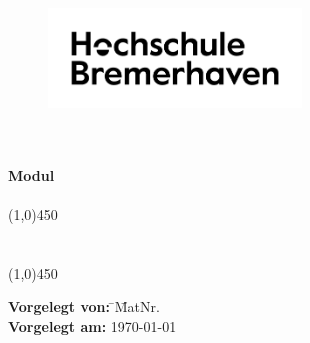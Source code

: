 \setmainfont{TeX Gyre Adventor}
\thispagestyle{empty}
\begin{figure}[h!]
	\centering
	\includegraphics[width=0.6\textwidth]{./images/hs-logo.png}
\end{figure}
\begin{center}
	\large{\textbf{\department}}\\
	\large{\textbf{\studyprogram}}\\
	\vspace{1cm}
	{
		\large{\textbf{Modul\\ \modulname}}\\
	}
	\vspace*{\fill}
	\line(1,0){450}\\
	\doublespacing
	\textbf{\Large{\thetitle}}\\
	\textbf{\large{\thesubtitle}}\\
	\line(1,0){450}\\
\end{center}
\vspace*{\fill}
\onehalfspacing
\small{
	\begin{flushleft}
		\begin{tabbing}
			\textbf{Vorgelegt von:} \hspace*{0.8cm}\= \theauthor \hspace*{\myspace}\= MatNr. \matriculationnumber \\


			\textbf{Vorgelegt am:} \> \today\\
			{
				\auditor\\
			}
		\end{tabbing}
	\end{flushleft}}
\setmainfont{TeX Gyre Termes}